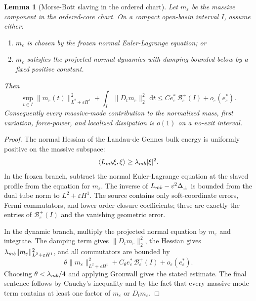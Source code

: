 \documentclass[10pt,a4paper]{amsart}
\newtheorem{lemma}{Lemma}
\newcommand{\Basin}{\mathcal B}
\newcommand{\dd}{\,\mathrm d}
\newcommand{\eps}{\varepsilon}
\newcommand{\estar}{e_\varepsilon^\ast}
\begin{document}
\begin{lemma}[Morse-Bott slaving in the ordered chart]
\label{lem:short-mb-slaving}
Let \(m_\eps\) be the massive component in the ordered-core chart.  On a compact
open-basin interval \(I\), assume either:
\begin{enumerate}[label=(\alph*)]
\item \(m_\eps\) is chosen by the frozen normal Euler-Lagrange equation; or
\item \(m_\eps\) satisfies the projected normal dynamics with damping bounded
below by a fixed positive constant.
\end{enumerate}
Then
\[
        \sup_{t\in I}
        \|m_\eps(t)\|_{L^2+\eps H^1}^2
        +
        \int_I\|D_t m_\eps\|_2^2\,\dd t
        \le
        C\estar\,\Basin_\eps^+(I)+o_\eps(\estar).
\]
Consequently every massive-mode contribution to the normalized mass,
first variation, force-power, and localized dissipation is \(o(1)\) on a
no-exit interval.
\end{lemma}

\begin{proof}
The normal Hessian of the Landau-de Gennes bulk energy is uniformly positive
on the massive subspace:
\[
        \langle L_{\rm mb}\xi,\xi\rangle
        \ge
        \lambda_{\rm mb}|\xi|^2 .
\]
In the frozen branch, subtract the normal Euler-Lagrange equation at the
slaved profile from the equation for \(m_\eps\).  The inverse of
\(L_{\rm mb}-\eps^2\Delta_\perp\) is bounded from the dual tube norm to
\(L^2+\eps H^1\).  The source contains only soft-coordinate errors, Fermi
commutators, and lower-order closure coefficients; these are exactly the
entries of \(\Basin_\eps^+(I)\) and the vanishing geometric error.

In the dynamic branch, multiply the projected normal equation by \(m_\eps\) and
integrate.  The damping term gives \(\|D_t m_\eps\|_2^2\), the Hessian gives
\(\lambda_{\rm mb}\|m_\eps\|_{L^2+\eps H^1}^2\), and all commutators are bounded
by
\[
        \theta\|m_\eps\|_{L^2+\eps H^1}^2
        +
        C_\theta \estar\,\Basin_\eps^+(I)
        +
        o_\eps(\estar).
\]
Choosing \(\theta<\lambda_{\rm mb}/4\) and applying Gronwall gives the stated
estimate.  The final sentence follows by Cauchy's inequality and by the fact
that every massive-mode term contains at least one factor of \(m_\eps\) or
\(D_t m_\eps\).
\end{proof}
\end{document}

